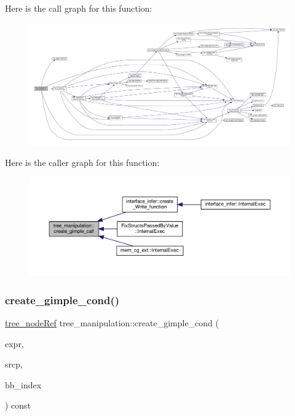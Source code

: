 Here is the call graph for this function\+:
\nopagebreak
\begin{figure}[H]
\begin{center}
\leavevmode
\includegraphics[width=350pt]{d0/d99/classtree__manipulation_a4ae45d68f51af7c5bb7a4f15d025f33e_cgraph}
\end{center}
\end{figure}
Here is the caller graph for this function\+:
\nopagebreak
\begin{figure}[H]
\begin{center}
\leavevmode
\includegraphics[width=350pt]{d0/d99/classtree__manipulation_a4ae45d68f51af7c5bb7a4f15d025f33e_icgraph}
\end{center}
\end{figure}
\mbox{\label{classtree__manipulation_a5fa5ef7d4e7746cf2d6ed737e5e9ace7}} 
\subsubsection{\texorpdfstring{create\+\_\+gimple\+\_\+cond()}{create\_gimple\_cond()}}
{\footnotesize\ttfamily \hyperlink{tree__node_8hpp_a6ee377554d1c4871ad66a337eaa67fd5}{tree\+\_\+node\+Ref} tree\+\_\+manipulation\+::create\+\_\+gimple\+\_\+cond (\begin{DoxyParamCaption}\item[{const \hyperlink{tree__node_8hpp_a6ee377554d1c4871ad66a337eaa67fd5}{tree\+\_\+node\+Ref} \&}]{expr,  }\item[{const std\+::string \&}]{srcp,  }\item[{unsigned int}]{bb\+\_\+index }\end{DoxyParamCaption}) const}



